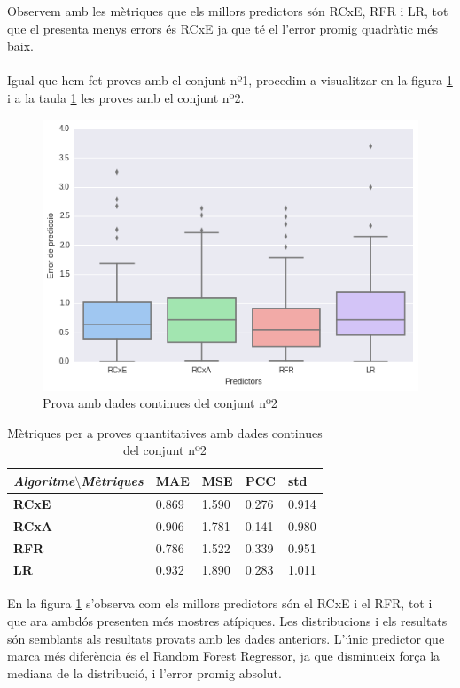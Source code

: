 \documentclass[12pt,a4paper,catalan]{article}
\begin{document}
Observem amb les mètriques que els millors predictors són RCxE, RFR i LR, tot que el presenta menys errors és RCxE ja que té el l'error promig quadràtic més baix.
\\
\\
Igual que hem fet proves amb el conjunt nº1, procedim a visualitzar en la figura \ref{fig:pdctps} i a la taula \ref{tab:mpqdcc2} les proves amb el conjunt nº2.

\begin{figure}[h]
\centering
\includegraphics[width=.7\linewidth]{img/boxplot_primersegon_tercer.png}
\caption{Prova amb dades continues del conjunt nº2}
\label{fig:pdctps}
\end{figure}

\begin{table}[h]
\centering
\begin{tabular}{lllll}
\hline
\textit{\textbf{Algoritme$\setminus$Mètriques}} & \textbf{MAE} & \textbf{MSE} & \textbf{PCC} & \textbf{std} \\ \hline
\textbf{RCxE}          & 0.869          & 1.590          & 0.276          & 0.914          \\
\textbf{RCxA}          & 0.906          & 1.781          & 0.141          & 0.980          \\
\textbf{RFR}           & 0.786          & 1.522          & 0.339          & 0.951          \\
\textbf{LR}            & 0.932          & 1.890          & 0.283          & 1.011          \\ \hline
\end{tabular}
\caption{Mètriques per a proves quantitatives amb dades continues del conjunt nº2}
\label{tab:mpqdcc2}
\end{table}

En la figura \ref{fig:pdctps} s'observa com els millors predictors són el RCxE i el RFR, tot i que ara ambdós presenten més mostres atípiques. Les distribucions i els resultats són semblants als resultats provats amb les dades anteriors. L'únic predictor que marca més diferència és el Random Forest Regressor, ja que disminueix força  la mediana de la distribució, i l'error promig absolut.
\end{document}
